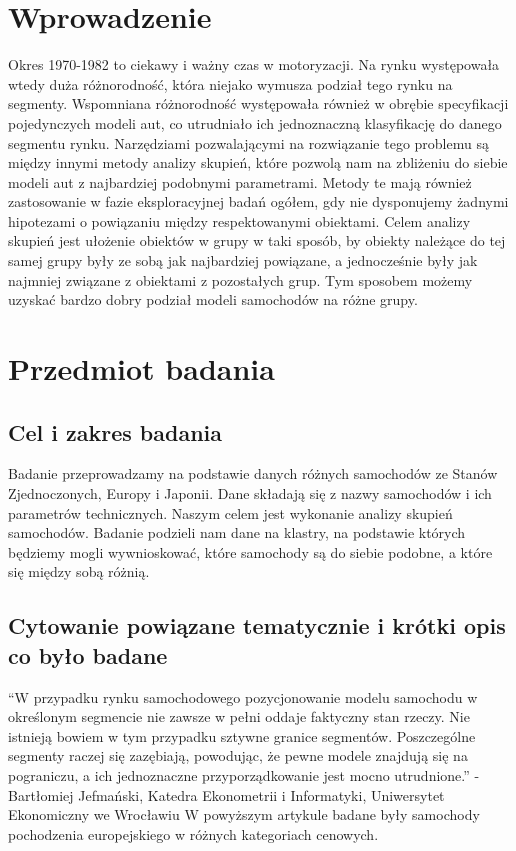 \documentclass{article}
\begin{document}
\section{Wprowadzenie}
Okres 1970-1982 to ciekawy i ważny czas w motoryzacji. Na rynku występowała wtedy duża różnorodność, która niejako wymusza podział tego rynku na segmenty. Wspomniana różnorodność występowała również w obrębie specyfikacji pojedynczych modeli aut, co utrudniało ich jednoznaczną klasyfikację do danego segmentu rynku. Narzędziami pozwalającymi na rozwiązanie tego problemu są między innymi metody analizy skupień, które pozwolą nam na zbliżeniu do siebie modeli aut z najbardziej podobnymi parametrami. Metody te mają również zastosowanie w fazie eksploracyjnej badań ogółem, gdy nie dysponujemy żadnymi hipotezami o powiązaniu między respektowanymi obiektami. Celem analizy skupień jest ułożenie obiektów w grupy w taki sposób, by obiekty należące do tej samej grupy były ze sobą jak najbardziej powiązane, a jednocześnie były jak najmniej związane z obiektami z pozostałych grup. Tym sposobem możemy uzyskać bardzo dobry podział modeli samochodów na różne grupy.
\section{Przedmiot badania}
    \subsection{Cel i zakres badania} 
    Badanie przeprowadzamy na podstawie danych różnych samochodów ze Stanów Zjednoczonych, Europy i Japonii. 
    Dane składają się z nazwy samochodów i ich parametrów technicznych.
    \newline\newline
    Naszym celem jest wykonanie analizy skupień samochodów. Badanie podzieli nam dane na klastry, na podstawie których będziemy mogli 
    wywnioskować, które samochody są do siebie podobne, a które się między sobą różnią. 
    \newline
    \subsection{Cytowanie powiązane tematycznie i krótki opis co było badane}
    ``W przypadku rynku samochodowego pozycjonowanie modelu samochodu w określonym segmencie nie zawsze w pełni oddaje faktyczny stan rzeczy. Nie istnieją bowiem w tym przypadku sztywne granice segmentów. Poszczególne segmenty raczej się zazębiają, powodując, że pewne modele znajdują się na pograniczu, a ich jednoznaczne przyporządkowanie jest mocno utrudnione.'' \newline- Bartłomiej Jefmański, Katedra Ekonometrii i Informatyki, Uniwersytet Ekonomiczny we Wrocławiu
    \newline\newline
    W powyższym artykule badane były samochody pochodzenia europejskiego w różnych kategoriach cenowych.
\end{document}
